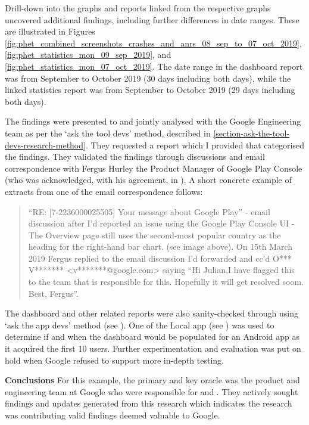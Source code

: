 Drill-down into the graphs and reports linked from the respective graphs uncovered additional findings, including further differences in date ranges. These are illustrated in Figures \ref{fig:phet_combined_screenshots_crashes_and_anrs_08_sep_to_07_oct_2019}, \ref{fig:phet_statistics_mon_09_sep_2019}, and \ref{fig:phet_statistics_mon_07_oct_2019}. The date range in the dashboard report was from  September to  October 2019 (30 days including both days), while the linked statistics report was from  September to  October 2019 (29 days including both days).


The findings were presented to and jointly analysed with the Google Engineering team as per the `ask the tool devs' method, described in \ref{section-ask-the-tool-devs-research-method}. They requested a report which I provided that categorised the findings. They validated the findings through discussions and email correspondence with Fergus Hurley the Product Manager of Google Play Console (who was acknowledged, with his agreement, in ). A short concrete example of extracts from one of the email correspondence follows:

\begin{quote}
    “RE: [7-2236000025505] Your message about Google Play” - email discussion after I’d reported an issue using the Google Play Console UI - The Overview page still uses the second-most popular country as the heading for the right-hand bar chart. (see image above). On 15th March 2019 Fergus replied to the email discussion I’d forwarded and cc’d O*** V******* <v*******@google.com> saying “Hi Julian,I have flagged this to the team that is responsible for this. Hopefully it will get resolved soom\sidenote{[sic]}. Best, Fergus”.

\end{quote}

The dashboard and other related reports were also sanity-checked through using `ask the app devs' method (see ). One of the Local app (see ) was used to determine if and when the dashboard would be populated for an Android app as it acquired the first 10 users. Further experimentation and evaluation was put on hold when Google refused to support more in-depth testing.


\textbf{Conclusions}
For this example, the primary and key oracle was the product and engineering team at Google who were responsible for  and . They actively sought findings and updates generated from this research which indicates the research was contributing valid findings deemed valuable to Google.
